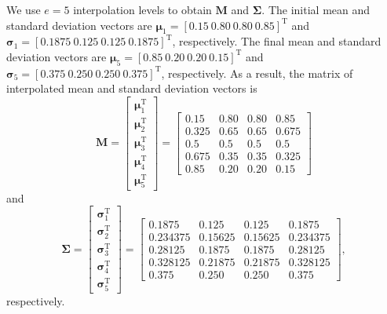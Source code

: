 We use $e=5$ interpolation levels to obtain $\mathbf{M}$ and $\boldsymbol{\Sigma}$. The initial mean and standard deviation vectors are $\boldsymbol{\mu}_1 = \left[0.15 ~ 0.80 ~ 0.80 ~ 0.85\right]^{\mathrm{T}}$ and $\boldsymbol{\sigma}_1 = \left[0.1875 ~ 0.125 ~ 0.125 ~ 0.1875\right]^{\mathrm{T}}$, respectively. The final mean and standard deviation vectors are $\boldsymbol{\mu}_5 = \left[0.85 ~ 0.20 ~ 0.20 ~ 0.15\right]^{\mathrm{T}}$ and $\boldsymbol{\sigma}_5 = \left[0.375 ~ 0.250 ~ 0.250 ~ 0.375\right]^{\mathrm{T}}$, respectively. As a result, the matrix of interpolated mean and standard deviation vectors is
%
\begin{equation*}
	\mathbf{M} = \begin{bmatrix}
		\boldsymbol{\mu}_1 ^ {\mathrm{T}} \\[4pt]
		\boldsymbol{\mu}_2 ^ {\mathrm{T}} \\[4pt]
		\boldsymbol{\mu}_3 ^ {\mathrm{T}} \\[4pt]
		\boldsymbol{\mu}_4 ^ {\mathrm{T}} \\[4pt]
		\boldsymbol{\mu}_5 ^ {\mathrm{T}} 
	\end{bmatrix} = \begin{bmatrix}
		0.15 & 0.80 & 0.80 & 0.85 \\[4pt]
		0.325 & 0.65 & 0.65 & 0.675 \\[4pt]
		0.5 & 0.5 & 0.5 & 0.5 \\[4pt]
		0.675 & 0.35 & 0.35 & 0.325 \\[4pt]
		0.85 & 0.20 & 0.20 & 0.15 
	\end{bmatrix}
\end{equation*}
%
and
%
\begin{equation*}
	\boldsymbol{\Sigma} = \begin{bmatrix}
		\boldsymbol{\sigma}_1 ^ {\mathrm{T}} \\[4pt]
		\boldsymbol{\sigma}_2 ^ {\mathrm{T}} \\[4pt]
		\boldsymbol{\sigma}_3 ^ {\mathrm{T}} \\[4pt]
		\boldsymbol{\sigma}_4 ^ {\mathrm{T}} \\[4pt]
		\boldsymbol{\sigma}_5 ^ {\mathrm{T}} 
	\end{bmatrix} = \begin{bmatrix}
		0.1875 & 0.125 & 0.125 & 0.1875 \\[4pt]
		0.234375 & 0.15625 & 0.15625 & 0.234375 \\[4pt]
		0.28125 & 0.1875 & 0.1875 & 0.28125 \\[4pt]
		0.328125 & 0.21875 & 0.21875 & 0.328125 \\[4pt]
		0.375 & 0.250 & 0.250 & 0.375
	\end{bmatrix},
\end{equation*}
%
respectively.

